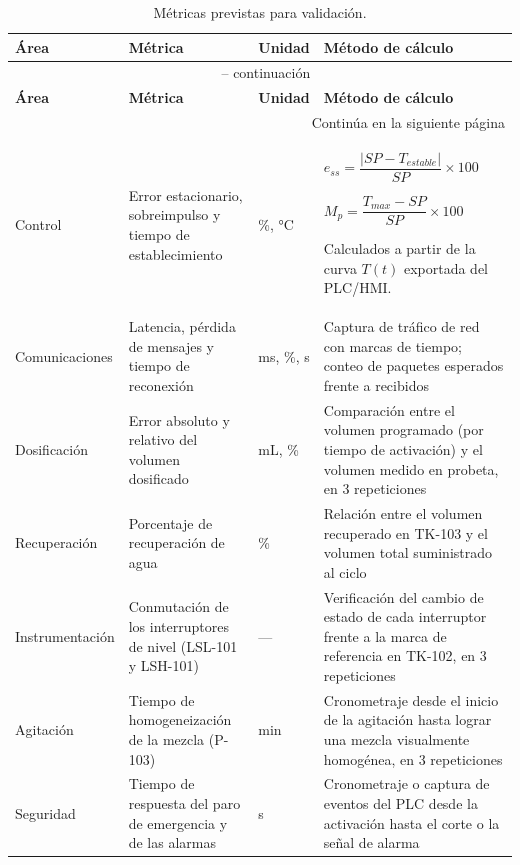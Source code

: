 \begin{longtable}{p{2.6cm} p{4.6cm} p{2.0cm} p{5.0cm}}
\caption{Métricas previstas para validación.}
\label{tab:metricas_validacion} \\
\toprule
\textbf{Área} & \textbf{Métrica} & \textbf{Unidad} & \textbf{Método de cálculo} \\
\midrule
\endfirsthead

\multicolumn{4}{c}{\tablename\ \thetable{} -- continuación} \\
\toprule
\textbf{Área} & \textbf{Métrica} & \textbf{Unidad} & \textbf{Método de cálculo} \\
\midrule
\endhead

\midrule
\multicolumn{4}{r}{Continúa en la siguiente página} \\
\endfoot

\bottomrule
\endlastfoot

Control & Error estacionario, sobreimpulso y tiempo de establecimiento & \%, °C &
\begin{minipage}[t]{5.0cm}
\vspace{2pt}
$\displaystyle e_{ss} = \dfrac{|SP - T_{estable}|}{SP}\times 100$

\vspace{6pt}
$\displaystyle M_p = \dfrac{T_{max}-SP}{SP}\times 100$

\vspace{6pt}
Calculados a partir de la curva $T(t)$ exportada del PLC/HMI.
\end{minipage} \\[4pt]
Comunicaciones & Latencia, pérdida de mensajes y tiempo de reconexión & ms, \%, s & Captura de tráfico de red con marcas de tiempo; conteo de paquetes esperados frente a recibidos \\
Dosificación & Error absoluto y relativo del volumen dosificado & mL, \% & Comparación entre el volumen programado (por tiempo de activación) y el volumen medido en probeta, en 3 repeticiones \\
Recuperación & Porcentaje de recuperación de agua & \% & Relación entre el volumen recuperado en TK-103 y el volumen total suministrado al ciclo \\
Instrumentación & Conmutación de los interruptores de nivel (LSL-101 y LSH-101) & --- & Verificación del cambio de estado de cada interruptor frente a la marca de referencia en TK-102, en 3 repeticiones \\
Agitación & Tiempo de homogeneización de la mezcla (P-103) & min & Cronometraje desde el inicio de la agitación hasta lograr una mezcla visualmente homogénea, en 3 repeticiones \\
Seguridad & Tiempo de respuesta del paro de emergencia y de las alarmas & s & Cronometraje o captura de eventos del PLC desde la activación hasta el corte o la señal de alarma \\

\end{longtable}